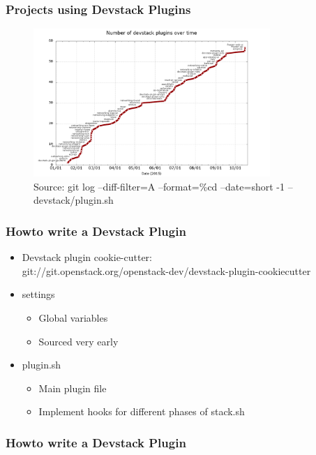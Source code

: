 \documentclass[aspectratio=169,11pt,hyperref={colorlinks=true}]{beamer}
\begin{document}
\begin{frame}
    \frametitle{Projects using Devstack Plugins}
    \begin{figure}[p]
    	\centering
    	\includegraphics[width=0.8\textwidth]{devstack-plugins.png}
    	\caption{Source: git log --diff-filter=A --format=\%cd --date=short -1 -- devstack/plugin.sh}
    \end{figure}
\end{frame}

\begin{frame}
    \frametitle{Howto write a Devstack Plugin}
    \begin{itemize}
    	\item Devstack plugin cookie-cutter: \hfill
    	\\ git://git.openstack.org/openstack-dev/devstack-plugin-cookiecutter
    \end{itemize}

    \begin{itemize}
        \item settings
        \begin{itemize}
            \item Global variables
            \item Sourced very early
        \end{itemize}
        \item plugin.sh
        \begin{itemize}
            \item Main plugin file
            \item Implement hooks for different phases of stack.sh
        \end{itemize}
    \end{itemize}
\end{frame}

\begin{frame}
    \frametitle{Howto write a Devstack Plugin}
        
\end{frame}
\end{document}
